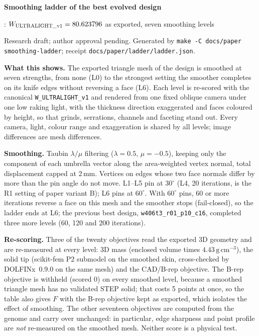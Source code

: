 \documentclass[10pt,letterpaper]{article}
\newcommand{\code}[1]{{\small\nolinkurl{#1}}}
\begin{document}
{\sffamily\bfseries\color{ink}\LARGE Smoothing ladder of the best evolved design}\par
{\sffamily\large \LadderLabel: $W_{\mathrm{ULTRALIGHT\_v1}}=80.623796$ as exported, seven smoothing levels}\par
{\small Research draft; author approval pending. Generated by \code{make -C docs/paper smoothing-ladder}; receipt \code{docs/paper/ladder/ladder.json}.}\par
\medskip
\textbf{What this shows.} The exported triangle mesh of the design is smoothed at seven strengths, from none (L0) to the strongest setting the smoother completes on its knife edges without reversing a face (L6). Each level is re-scored with the canonical \code{W_ULTRALIGHT_v1} and rendered from one fixed oblique camera under one low raking light, with the thickness direction exaggerated and faces coloured by height, so that grinds, serrations, channels and faceting stand out. Every camera, light, colour range and exaggeration is shared by all levels; image differences are mesh differences.

\textbf{Smoothing.} Taubin $\lambda/\mu$ filtering ($\lambda=0.5$, $\mu=-0.5$), keeping only the component of each umbrella vector along the area-weighted vertex normal, total displacement capped at 2\,mm. Vertices on edges whose two face normals differ by more than the pin angle do not move. L1--L5 pin at $30^\circ$ (L4, 20 iterations, is the R1 setting of paper variant B); L6 pins at $60^\circ$. With $60^\circ$ pins, 60 or more iterations reverse a face on this mesh and the smoother stops (fail-closed), so the ladder ends at L6; the previous best design, \code{w406t3_r01_p10_c16}, completed three more levels (60, 120 and 200 iterations).

\textbf{Re-scoring.} Three of the twenty objectives read the exported 3D geometry and are re-measured at every level: 3D mass (enclosed volume times $4.43\,\mathrm{g\,cm^{-3}}$), the solid tip (scikit-fem P2 submodel on the smoothed skin, cross-checked by DOLFINx~0.9.0 on the same mesh) and the CAD/B-rep objective. The B-rep objective is withheld (scored 0) on every smoothed level, because a smoothed triangle mesh has no validated STEP solid; that costs 5 points at once, so the table also gives $F$ with the B-rep objective kept as exported, which isolates the effect of smoothing. The other seventeen objectives are computed from the genome and carry over unchanged: in particular, edge sharpness and point profile are \emph{not} re-measured on the smoothed mesh. Neither score is a physical test.
\end{document}
